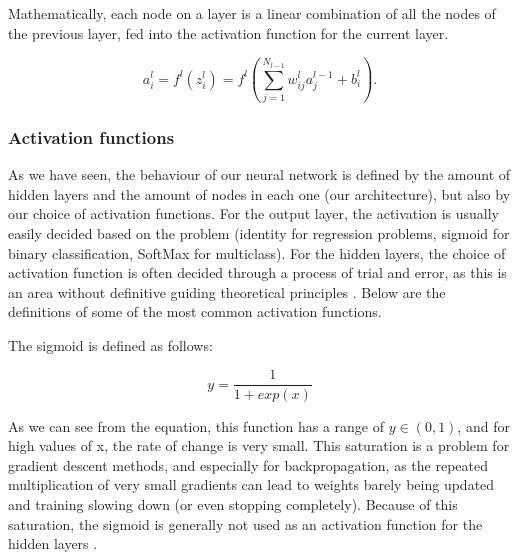 \documentclass[onecolumn,10pt,cleanfoot]{asme2ej}
\begin{document}
Mathematically, each node on a layer is a linear combination of all the nodes of the previous layer, fed into the activation function for the current layer.

\begin{equation}
a_i^l = f^l(z_i^l) = f^l\left(\sum_{j=1}^{N_{l-1}} w_{ij}^l a_j^{l-1} + b_i^l\right).
\end{equation}

%
%

\subsubsection{Activation functions}

As we have seen, the behaviour of our neural network is defined by the amount of hidden layers and the amount of nodes in each one (our architecture), but also by our choice of activation functions. For the output layer, the activation is usually easily decided based on the problem (identity for regression problems, sigmoid for binary classification, SoftMax for multiclass). For the hidden layers, the choice of activation function is often decided through a process of trial and error, as this is an area without definitive guiding theoretical principles \cite[188]{gbc}. Below are the definitions of some of the most common activation functions.

The sigmoid is defined as follows:

\begin{equation}
y = \frac{1}{1 + exp(x)}
\end{equation}

As we can see from the equation, this function has a range of $y \in (0,1)$, and for high values of x, the rate of change is very small. This saturation is a problem for gradient descent methods, and especially for backpropagation, as the repeated multiplication of very small gradients can lead to weights barely being updated and training slowing down (or even stopping completely). Because of this saturation, the sigmoid is generally not used as an activation function for the hidden layers \cite[191]{gbc}.
\end{document}
